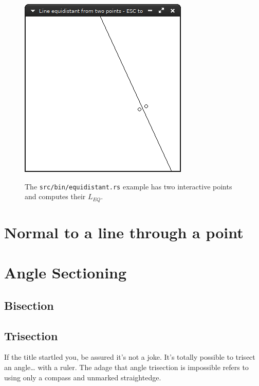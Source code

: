\documentclass[12pt,openany,a4,usenames,dvipsnames]{book}
\DeclareRobustCommand{\Caption}[1]{\par%
  \vspace{1em}
  {\noindent{}#1}}
\begin{document}
\begin{figure}[H]
\begin{minipage}{0.49\textwidth}
    \includegraphics[width=\textwidth,keepaspectratio]{figures/equidistant2.png}
  \end{minipage}
  \Caption{The \texttt{src/bin/equidistant.rs} example has two interactive points and computes their $L_{EQ}$.}
\end{figure}
\chapter{Normal to a line through a point}
\skelpar%
\chapter{Angle Sectioning}
\section{Bisection}
\section{Trisection}
If the title startled you, be assured it's not a joke. It's totally possible to trisect an angle\ldots{} with a ruler. The adage that angle trisection is impossible refers to using only a compass and unmarked straightedge.
\end{document}
